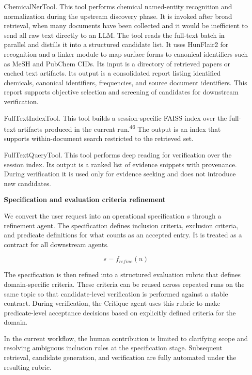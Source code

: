 \documentclass[
]{article}
\begin{document}
ChemicalNerTool. This tool performs chemical named-entity recognition
and normalization during the upstream discovery phase. It is invoked
after broad retrieval, when many documents have been collected and it
would be inefficient to send all raw text directly to an LLM. The tool
reads the full-text batch in parallel and distills it into a structured
candidate list. It uses HunFlair2 for recognition and a linker module to
map surface forms to canonical identifiers such as MeSH and PubChem
CIDs. Its input is a directory of retrieved papers or cached text
artifacts. Its output is a consolidated report listing identified
chemicals, canonical identifiers, frequencies, and source document
identifiers. This report supports objective selection and screening of
candidates for downstream verification.

FullTextIndexTool. This tool builds a session-specific FAISS index over
the full-text artifacts produced in the current
run.\textsuperscript{46} The output is an index that supports
within-document search restricted to the retrieved set.

FullTextQueryTool. This tool performs deep reading for verification
over the session index. Its output is a ranked list of evidence snippets
with provenance. During verification it is used only for evidence
seeking and does not introduce new candidates.

\textbf{Specification and evaluation criteria refinement}

We convert the user request into an operational specification \(s\)
through a refinement agent. The specification defines inclusion
criteria, exclusion criteria, and predicate definitions for what counts
as an accepted entry. It is treated as a contract for all downstream
agents.

\[s = f_{refine}(u)\]

The specification is then refined into a structured evaluation rubric
that defines domain-specific criteria. These criteria can be reused
across repeated runs on the same topic so that candidate-level
verification is performed against a stable contract. During
verification, the Critique agent uses this rubric to make
predicate-level acceptance decisions based on explicitly defined
criteria for the domain.

In the current workflow, the human contribution is limited to clarifying
scope and resolving ambiguous inclusion rules at the specification
stage. Subsequent retrieval, candidate generation, and verification are
fully automated under the resulting rubric.
\end{document}
